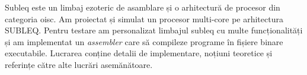 \documentclass[../main.tex]{subfiles}
\begin{document}
    Subleq este un limbaj ezoteric de asamblare și o arhitectură de procesor din categoria 
    \acrfull{oisc}. Am proiectat și simulat un procesor multi-core pe arhitectura SUBLEQ. Pentru testare
    am personalizat limbajul subleq cu multe funcționalități și am implementat un \emph{assembler}
    care să compileze programe în fișiere binare executabile. Lucrarea conține detalii de
    implementare, noțiuni teoretice și referințe către alte lucrări asemănătoare.
\end{document}
